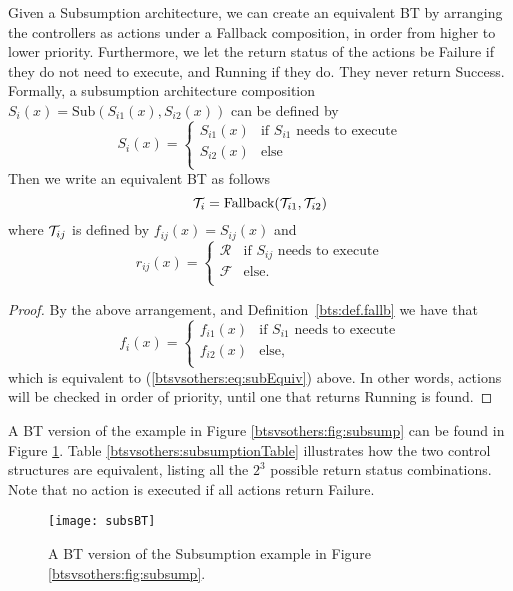\begin{lemma}
\label{btsvsothers:lem:sub}
Given a Subsumption architecture, we can create an equivalent BT by arranging the controllers as actions under a Fallback composition, in order from higher to lower priority. Furthermore, we let the return status of the actions be Failure if they do not need to execute, and Running if they do. They never return Success.
Formally, a subsumption architecture composition $S_i(x)=\mbox{Sub}(S_{i1}(x),S_{i2}(x))$ can be defined by
\begin{equation}
 \label{btsvsothers:eq:subEquiv}
S_i(x) = \begin{cases}
S_{i1}(x) & \mbox{if  $S_{i1}$ needs to execute} \\ 
S_{i2}(x) & \mbox{else} \\ 
\end{cases}
\end{equation}
Then we write an equivalent BT as follows
 \begin{equation}
 \mathcal{T}_i=\mbox{Fallback}( \mathcal{T}_{i1},\mathcal{T}_{i2})
\end{equation}
where $ \mathcal{T}_{ij}$ is defined by $f_{ij}(x)=S_{ij}(x)$ and
\begin{equation}
r_{ij}(x) = \begin{cases}
\mathcal{R} & \mbox{if  $S_{ij}$ needs to execute} \\ 
\mathcal{F} & \mbox{else}. \\ 
\end{cases}
\end{equation}

\end{lemma}
\begin{proof}
By the above arrangement, and Definition~\ref{bts:def.fallb} we have that
\begin{equation}
f_i(x) = \begin{cases}
f_{i1}(x) & \mbox{if  $S_{i1}$ needs to execute} \\ 
f_{i2}(x) & \mbox{else}, \\ 
\end{cases}
\end{equation}
which is equivalent to (\ref{btsvsothers:eq:subEquiv}) above.
In other words, actions will be checked in order of priority, until one that returns Running is found. 
\end{proof}

A BT version of the example in Figure  \ref{btsvsothers:fig:subsump} can be found in Figure  \ref{btsvsothers:fig:subsBT}. Table \ref{btsvsothers:subsumptionTable} illustrates how the two control structures are equivalent, listing all the $2^3$ possible return status combinations. Note that no action is executed if all actions return Failure.
\begin{figure}[htbp]
\begin{center}
\texttt{[image: subsBT]}
\caption{A BT version of the Subsumption example in Figure  \ref{btsvsothers:fig:subsump}. }
\label{btsvsothers:fig:subsBT}
\end{center}
\end{figure}

